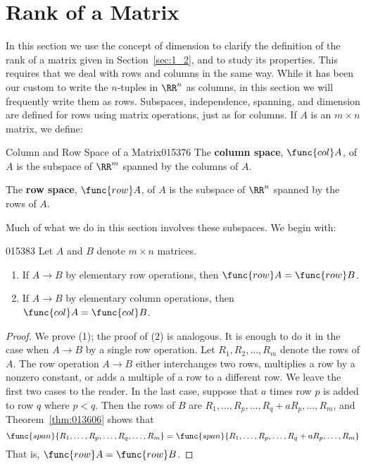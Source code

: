 \section{Rank of a Matrix}
\label{sec:5_4}

In this section we use the concept of dimension to clarify the definition of the rank of a matrix given in Section~\ref{sec:1_2}, and to study its properties. This requires that we deal with rows and columns in the same way. While it has been our custom to write the $n$-tuples in $\RR^n$ as columns, in this section we will frequently write them as rows. Subspaces, independence, spanning, and dimension are defined for rows using matrix operations, just as for columns. If $A$ is an $m \times n$ matrix, we define:

\begin{definition}{Column and Row Space of a Matrix}{015376} %
The \textbf{column space}, $\func{col} A$, of $A$ is the subspace of $\RR^m$ spanned by the columns of $A$.

The \textbf{row space}, $\func{row} A$, of $A$ is the subspace of $\RR^n$ spanned by the rows of $A$.
\end{definition}

\noindent Much of what we do in this section involves these subspaces. We begin with:

\begin{lemma}{}{015383}
Let $A$ and $B$ denote $m \times n$ matrices.

\begin{enumerate}
\item If $A \to B$ by elementary row operations, then $\func{row} A = \func{row} B$.

\item If $A \to B$ by elementary column operations, then $\func{col} A = \func{col} B$.

\end{enumerate}
\end{lemma}

\begin{proof}
We prove (1); the proof of (2) is analogous. It is enough to do it in the case when $A \to B$ by a single row operation. Let
$R_{1}, R_{2}, \dots, R_{m}$ denote the rows of $A$. The row
operation $A \to B$ either interchanges two rows, multiplies a row by
a nonzero constant, or adds a multiple of a row to a different row. We
leave the first two cases to the reader. In the last case, suppose
that $a$ times row $p$ is added to row $q$ where $p < q$. Then the
rows of $B$ are $R_{1}, \dots, R_{p}, \dots, R_{q} + aR_p, \dots,
R_{m}$, and Theorem~\ref{thm:013606} shows that
\begin{equation*}
\func{span}\{ R_1, \dots, R_p, \dots, R_q, \dots, R_m \} =
\func{span}\{ R_1, \dots, R_p, \dots, R_q + aR_p, \dots, R_m \}
\end{equation*}
That is, $\func{row} A = \func{row} B$.
\end{proof}

